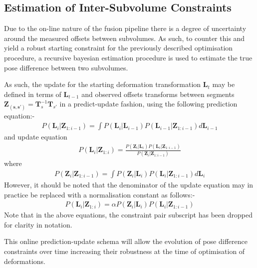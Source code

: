 \subsection{Estimation of Inter-Subvolume Constraints}
Due to the on-line nature of the fusion pipeline there is a degree of uncertainty around the measured offsets between subvolumes. As such, to 
counter this and yield a robust starting constraint for the previously described optimisation procedure, a recursive bayesian estimation 
procedure is used to estimate the true pose difference between two subvolumes.

As such, the update for the starting deformation transformation $\mathbf{L}_{t}$ may be defined in 
terms of $\mathbf{L}_{t-1}$ and observed offsets transforms between segments $\mathbf{Z_{(s, s')}} = \mathbf{T}_{s}^{-1}\mathbf{T}_{s'}$  in a predict-update fashion, using the following prediction equation:-
\begin{equation}
\begin{split}
P(\mathbf{L}_{i} | \mathbf{Z}_{1:i-1}) = \int P(\mathbf{L}_{i} | \mathbf{L}_{i-1})P(\mathbf{L}_{i-1} | \mathbf{Z}_{1:i-1}) d\mathbf{L}_{i-1}
\end{split}
\end{equation}
and update equation
\begin{equation}
\begin{split}
P(\mathbf{L}_{i} | \mathbf{Z}_{1:i}) = \frac{P(\mathbf{Z}_{i} | \mathbf{L}_{i})P(\mathbf{L}_{i} | \mathbf{Z}_{1:i-1})}{P(\mathbf{Z}_{i} | \mathbf{Z}_{1:i-1})}
\end{split}
\end{equation}
where
\begin{equation}
\begin{split}
P(\mathbf{Z}_{i} | \mathbf{Z}_{1:i-1}) = \int P(\mathbf{Z}_{i} | \mathbf{L}_{i})P(\mathbf{L}_{i} | \mathbf{Z}_{1:i-1}) d\mathbf{L}_{i}
\end{split}
\end{equation}
However, it should be noted that the denominator of the update equation may in practice be replaced with a normalisation constant as follows:-
\begin{equation}
\begin{split}
P(\mathbf{L}_{i} | \mathbf{Z}_{1:i}) = \alpha P(\mathbf{Z}_{i} | \mathbf{L}_{i})P(\mathbf{L}_{i} | \mathbf{Z}_{1:i-1})
\end{split}
\end{equation}
Note that in the above equations, the constraint pair subscript has been dropped for clarity in notation.

This online prediction-update schema will allow the evolution of pose difference constraints over time increasing their robustness at the time 
of optimisation of deformations.